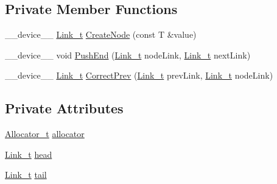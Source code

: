 \subsection*{Private Member Functions}
\begin{DoxyCompactItemize}
\item 
\+\_\+\+\_\+device\+\_\+\+\_\+ \mbox{\hyperlink{class_n_u_c_a_r_lock_free_d_s_1_1_lock_free_doubly_linked_list_a08f21d5e04bc2a02d6c1d8861a6ba0de}{Link\+\_\+t}} \mbox{\hyperlink{class_n_u_c_a_r_lock_free_d_s_1_1_lock_free_doubly_linked_list_a434fe84d6ee18bd68ff43b1448c17dbd}{Create\+Node}} (const T \&value)
\item 
\+\_\+\+\_\+device\+\_\+\+\_\+ void \mbox{\hyperlink{class_n_u_c_a_r_lock_free_d_s_1_1_lock_free_doubly_linked_list_aa174dd2ed75ca47e5a56d212558cff21}{Push\+End}} (\mbox{\hyperlink{class_n_u_c_a_r_lock_free_d_s_1_1_lock_free_doubly_linked_list_a08f21d5e04bc2a02d6c1d8861a6ba0de}{Link\+\_\+t}} node\+Link, \mbox{\hyperlink{class_n_u_c_a_r_lock_free_d_s_1_1_lock_free_doubly_linked_list_a08f21d5e04bc2a02d6c1d8861a6ba0de}{Link\+\_\+t}} next\+Link)
\item 
\+\_\+\+\_\+device\+\_\+\+\_\+ \mbox{\hyperlink{class_n_u_c_a_r_lock_free_d_s_1_1_lock_free_doubly_linked_list_a08f21d5e04bc2a02d6c1d8861a6ba0de}{Link\+\_\+t}} \mbox{\hyperlink{class_n_u_c_a_r_lock_free_d_s_1_1_lock_free_doubly_linked_list_ac7ee6264f3403d6ac63b63614cf6d72a}{Correct\+Prev}} (\mbox{\hyperlink{class_n_u_c_a_r_lock_free_d_s_1_1_lock_free_doubly_linked_list_a08f21d5e04bc2a02d6c1d8861a6ba0de}{Link\+\_\+t}} prev\+Link, \mbox{\hyperlink{class_n_u_c_a_r_lock_free_d_s_1_1_lock_free_doubly_linked_list_a08f21d5e04bc2a02d6c1d8861a6ba0de}{Link\+\_\+t}} node\+Link)
\end{DoxyCompactItemize}
\subsection*{Private Attributes}
\begin{DoxyCompactItemize}
\item 
\mbox{\hyperlink{class_n_u_c_a_r_lock_free_d_s_1_1_lock_free_doubly_linked_list_af534991f4eb0641191f936a80c701e6c}{Allocator\+\_\+t}} \mbox{\hyperlink{class_n_u_c_a_r_lock_free_d_s_1_1_lock_free_doubly_linked_list_a7b3c4526b9593afc237fc2e5f7934a15}{allocator}}
\item 
\mbox{\hyperlink{class_n_u_c_a_r_lock_free_d_s_1_1_lock_free_doubly_linked_list_a08f21d5e04bc2a02d6c1d8861a6ba0de}{Link\+\_\+t}} \mbox{\hyperlink{class_n_u_c_a_r_lock_free_d_s_1_1_lock_free_doubly_linked_list_a88b740e087ee76139d5291fcd70cf879}{head}}
\item 
\mbox{\hyperlink{class_n_u_c_a_r_lock_free_d_s_1_1_lock_free_doubly_linked_list_a08f21d5e04bc2a02d6c1d8861a6ba0de}{Link\+\_\+t}} \mbox{\hyperlink{class_n_u_c_a_r_lock_free_d_s_1_1_lock_free_doubly_linked_list_a026dc6f5ad4ec7007de1cf858f9c1c2d}{tail}}
\end{DoxyCompactItemize}


